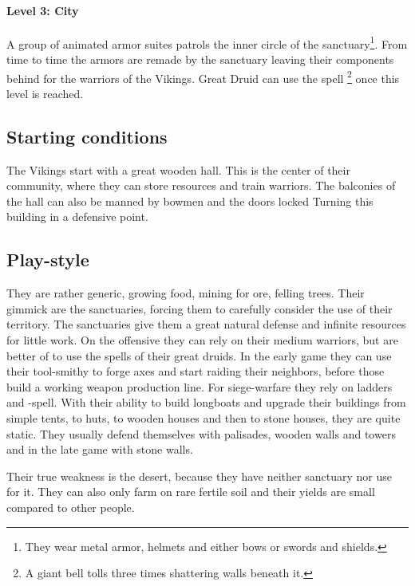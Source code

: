 \paragraph{Level 3: City}
A group of animated armor suites patrols the inner circle of the
sanctuary\footnote{ They wear metal armor, helmets and either bows or swords
	and shields. }. From time to time the armors are remade by the sanctuary
leaving their components behind for the warriors of the \gls{Vikings}. Great
Druid can use the spell \footnote{ A giant bell tolls
	three times shattering walls beneath it. } once this level is reached.

\subsection{Starting conditions}
The \gls{Vikings} start with a great wooden hall. This is the center of their
community, where they can store resources and train warriors. The balconies of
the hall can also be manned by bowmen and the doors locked Turning this
building in a defensive point.

\subsection{Play-style}
They are rather generic, growing food, mining for ore, felling trees. Their
gimmick are the sanctuaries, forcing them to carefully consider the use of
their territory. The sanctuaries give them a great natural defense and infinite
resources for little work. On the offensive they can rely on their medium
warriors, but are better of to use the spells of their great druids. In the
early game they can use their tool-smithy to forge axes and start raiding their
neighbors, before those build a working weapon production line. For
siege-warfare they rely on ladders and -spell. With
their ability to build longboats and upgrade their buildings from simple tents,
to huts, to wooden houses and then to stone houses, they are quite static. They
usually defend themselves with palisades, wooden walls and towers and in the
late game with stone walls.

Their true weakness is the desert, because they have neither sanctuary nor use
for it. They can also only farm on rare fertile soil and their yields are small
compared to other people.
